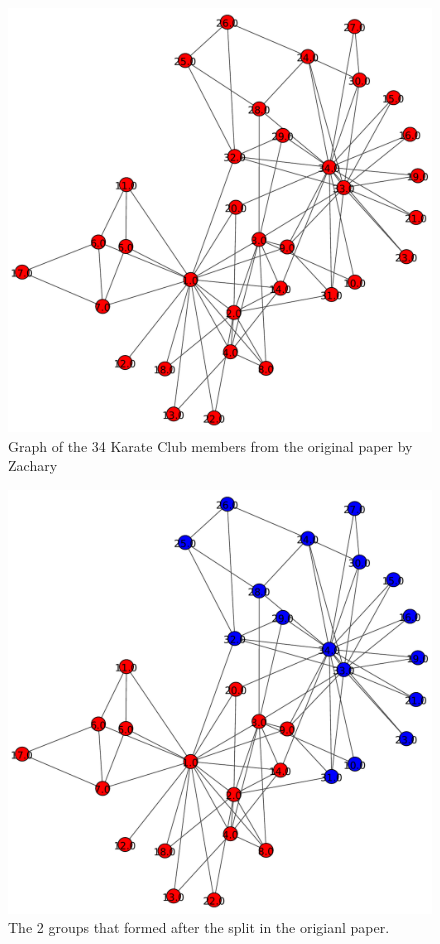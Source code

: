 \documentclass{article}
\begin{document}
\begin{figure}[H]
 \centering
 	\includegraphics[width=\linewidth]{KarateClub.pdf}
  \caption{Graph of the 34 Karate Club members from the original paper by Zachary}
\end{figure}

\begin{figure}[H]
 \centering
 	\includegraphics[height=10 cm]{KarateClubFactions.pdf}
  \caption{The 2 groups that formed after the split in the origianl paper.}
\end{figure}
\end{document}
